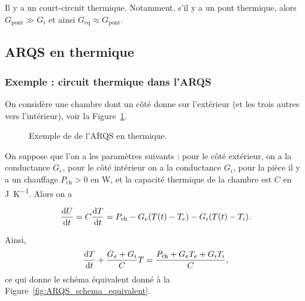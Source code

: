         Il y a un \og court-circuit thermique\fg. Notamment, s'il y a un pont thermique, alors $G_{\text{pont}}\gg G_i$ et ainsi $G_{\text{eq}}\approx G_{\text{pont}}$.

    \subsection{ARQS en thermique}

        \subsubsection{Exemple : circuit thermique dans l'ARQS}

            On considère une chambre dont un côté donne sur l'extérieur (et les trois autres vers l'intérieur), voir la Figure~\ref{fig:ARSQ_thermique_exemple}.
            \begin{figure}
                \centering
                \caption{Exemple de de l'ARQS en thermique.}    
                \label{fig:ARSQ_thermique_exemple}
            \end{figure}

            On suppose que l'on a les paramètres suivants : pour le côté extérieur, on a la conductance $G_e$, pour le côté intérieur on a la conductance $G_i$, pour la pièce il y a un chauffage $P_{\text{ch}}>0$ en \si{\watt}, et la capacité thermique de la chambre est $C$ en \si{\joule\per\kelvin}. Alors on a

            \begin{equation}
                \frac{\mathrm{d} U}{\mathrm{d} t}=C\frac{\mathrm{d} T}{\mathrm{d} t}=P_{\text{ch}}-G_e(T(t)-T_e)-G_i(T(t)-T_i).
            \end{equation}

            Ainsi,
            \begin{equation}
                \frac{\mathrm{d} T}{\mathrm{d} t}+\frac{G_e+G_i}{C}T=\frac{P_{\text{ch}}+G_e T_e+G_i T_i}{C},
            \end{equation}
            ce qui donne le schéma équivalent donné à la Figure~\ref{fig:ARQS_schema_equivalent}.

